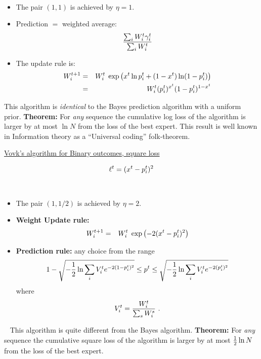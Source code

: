 \begin{flushleft}
\begin{LARGE}
~
\begin{itemize}
\item
The pair $(1,1)$ is achieved by $\eta=1$.
\item
Prediction $=$ weighted average:
\[
	{\sum_i W_{i}^{t} \gamma_i^t
	\over
	 \sum_i W_{i}^{t}}
\]
\item
The update rule is:
\begin{eqnarray*}
W_{i}^{t+1} &=& W_{i}^{t} \; 
                  \exp \left(x^t \ln p_i^t +(1-x^t) \ln (1-p_i^t)\right)\\
&=& W_{i}^{t} (p_i^t)^{x^t} (1-p_i^t)^{1-x^t}
\end{eqnarray*}
\end{itemize}
This algorithm is {\em identical} to the Bayes prediction algorithm with 
a uniform prior.
\newline\newline
{\bf Theorem:} For {\em any} sequence the cumulative log loss of the
algorithm is larger by at most $\ln N$ from the loss of the best
expert.
\newline\newline
This result is well known in Information theory as a ``Universal
coding'' folk-theorem.
\pagebreak

\begin{center}
\underline{Vovk's algorithm for Binary outcomes, square loss}
\end{center}
\[ \ell_{}^{t} = (x^t - p_i^t)^2 \]

~
\begin{itemize}
\item
The pair $(1,1/2)$ is achieved by $\eta=2$.
\item
{\bf Weight Update rule:}
\begin{eqnarray*}
W_{i}^{t+1} &=& W_{i}^{t} \; 
                  \exp \left(-2 (x^t - p_i^t)^2 \right)
\end{eqnarray*}
\item
{\bf Prediction rule:} any choice from the range
\[
1-\sqrt{ -{1 \over 2} \ln \sum_i V_{i}^{t} e^{-2(1-p^t_i)^2} }
\leq
p^t
\leq
\sqrt{ -{1 \over 2} \ln \sum_i V_{i}^{t} e^{-2(p^t_i)^2} }
\]
where
\[
	V_{i}^{t} = {W_{i}^{t} \over \sum_s W_{i}^{s}}~.
\]
\end{itemize}
~\newline
This algorithm is quite different from the Bayes algorithm.
\newline\newline
{\bf Theorem:} For {\em any} sequence the cumulative square loss
of the algorithm is larger by at most ${1\over 2}\ln N$ 
from the loss of the best expert.
\pagebreak


\end{LARGE}
\end{flushleft}
